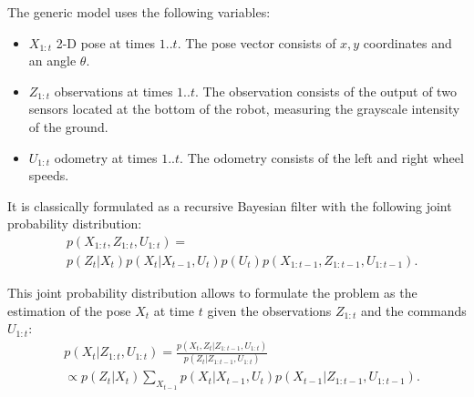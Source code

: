 \documentclass[letterpaper, 10pt, conference]{ieeeconf}
\begin{document}
The generic model uses the following variables:
\begin{itemize}
\item $X_{1:t}$ 2-D pose at times $1..t$.
The pose vector consists of $x,y$ coordinates and an angle $\theta$.
\item $Z_{1:t}$ observations at times $1..t$.
The observation consists of the output of two sensors located at the bottom of the robot, measuring the grayscale intensity of the ground.
\item $U_{1:t}$ odometry at times $1..t$.
The odometry consists of the left and right wheel speeds.
\end{itemize}

It is classically formulated as a recursive Bayesian filter with the following joint probability distribution:
\begin{equation*}
\begin{split}
& p(X_{1:t}, Z_{1:t}, U_{1:t}) = \\
& p(Z_t|X_t) p(X_t|X_{t-1}, U_{t}) p(U_t) p(X_{1:t-1}, Z_{1:t-1}, U_{1:t-1}).
\end{split}
\end{equation*}

This joint probability distribution allows to formulate the problem as the estimation of the pose $X_t$ at time $t$ given the observations $Z_{1:t}$ and the commands $U_{1:t}$:
\begin{equation*}
\begin{split}
& p(X_t|Z_{1:t},U_{1:t}) = \frac{p(X_t,Z_t | Z_{1:t-1}, U_{1:t})}{p(Z_t|Z_{1:t-1}, U_{1:t})} \\
 &\propto p(Z_t | X_t) \sum_{X_{t-1}} p(X_t|X_{t-1}, U_t) p(X_{t-1} | Z_{1:t-1}, U_{1:t-1}).
\end{split}
\end{equation*}
\end{document}

